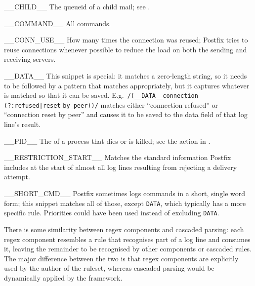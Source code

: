 \begin{eqlist}

    \squeezeitems{}

    \item [\_\_CHILD\_\_]  The queueid of a child mail; see
        .

    \item [\_\_COMMAND\_\_]  All  commands.

    \item [\_\_CONN\_USE\_\_]  How many times the connection was reused;
        Postfix tries to reuse connections whenever possible to reduce the
        load on both the sending and receiving servers.

    \item [\_\_DATA\_\_]  This snippet is special: it matches a zero-length
        string, so it needs to be followed by a pattern that matches
        appropriately, but it captures whatever is matched so that it can
        be saved.  E.g.\ \verb!/(__DATA__connection (?:refused|reset!
        \newline{} \tab{}\verb!by peer))/! matches either ``connection
        refused'' or ``connection reset by peer'' and causes it to be saved
        to the data field of that log line's result.

    \item [\_\_PID\_\_]  The  of a  process that
        dies or is killed; see the  action in
        .

    \item [\_\_RESTRICTION\_START\_\_]  Matches the standard information
        Postfix includes at the start of almost all log lines resulting
        from rejecting a delivery attempt.

    \item [\_\_SHORT\_CMD\_\_]  Postfix sometimes logs 
        commands in a short, single word form; this snippet matches all of
        those, except \texttt{DATA}, which typically has a more specific
        rule.  Priorities could have been used instead of excluding
        \texttt{DATA}.


\end{eqlist}

There is some similarity between regex components and cascaded parsing:
each regex component resembles a rule that recognises part of a log line
and consumes it, leaving the remainder to be recognised by other components
or cascaded rules.  The major difference between the two is that regex
components are explicitly used by the author of the ruleset, whereas
cascaded parsing would be dynamically applied by the framework.

